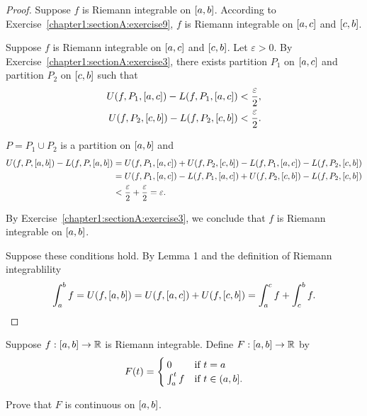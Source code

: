 \begin{proof}
    Suppose $f$ is Riemann integrable on $\left[{a, b}\right]$. According to Exercise~\ref{chapter1:sectionA:exercise9}, $f$ is Riemann integrable on $\left[{a, c}\right]$ and $\left[{c, b}\right]$.

    Suppose $f$ is Riemann integrable on $\left[{a, c}\right]$ and $\left[{c, b}\right]$. Let $\varepsilon > 0$. By Exercise~\ref{chapter1:sectionA:exercise3}, there exists partition $P_{1}$ on $\left[{a, c}\right]$ and partition $P_{2}$ on $\left[{c, b}\right]$ such that
    \[
        \begin{split}
            U(f, P_{1}, \left[{a, c}\right]) - L(f, P_{1}, \left[{a, c}\right]) < \frac{\varepsilon}{2}, \\
            U(f, P_{2}, \left[{c, b}\right]) - L(f, P_{2}, \left[{c, b}\right]) < \frac{\varepsilon}{2}.
        \end{split}
    \]

    $P = P_{1}\cup P_{2}$ is a partition on $\left[{a, b}\right]$ and
    \begin{align*}
        U(f, P, \left[{a, b}\right]) - L(f, P, \left[{a, b}\right]) & = U(f, P_{1}, \left[{a, c}\right]) + U(f, P_{2}, \left[{c, b}\right]) - L(f, P_{1}, \left[{a, c}\right]) - L(f, P_{2}, \left[{c, b}\right])  \\
                                                                        & = U(f, P_{1}, \left[{a, c}\right]) - L(f, P_{1}, \left[{a, c}\right]) +  U(f, P_{2}, \left[{c, b}\right]) - L(f, P_{2}, \left[{c, b}\right]) \\
                                                                        & < \frac{\varepsilon}{2} + \frac{\varepsilon}{2} = \varepsilon.
    \end{align*}

    By Exercise~\ref{chapter1:sectionA:exercise3}, we conclude that $f$ is Riemann integrable on $\left[{a, b}\right]$.

    \bigskip
    Suppose these conditions hold. By Lemma 1 and the definition of Riemann integrablility
    \[
        \int^{b}_{a}f = U(f, \left[{a, b}\right]) = U(f, \left[{a, c}\right]) + U(f, \left[{c, b}\right]) = \int^{c}_{a}f + \int^{b}_{c}f.\qedhere
    \]
\end{proof}
\newpage

\begin{exercise}\label{chapter1:sectionA:exercise11}
    Suppose $f: \left[{a, b}\right]\to\mathbb{R}$ is Riemann integrable. Define $F: \left[{a,b}\right]\to\mathbb{R}$ by
    \[
        F(t) = \begin{cases}
            0             & \text{if $t = a$}                    \\
            \int^{t}_{a}f & \text{if $t\in\left({a, b}\right]$.}
        \end{cases}
    \]

    Prove that $F$ is continuous on $\left[{a,b}\right]$.
\end{exercise}

